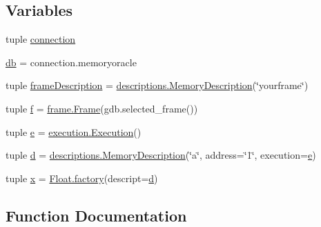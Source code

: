 \subsection*{Variables}
\begin{DoxyCompactItemize}
\item 
tuple \hyperlink{namespacememoryoracle_1_1instance_a5e1db5ce414b598e74fcabb1803e1eb0}{connection}
\item 
\hyperlink{namespacememoryoracle_1_1instance_ad0b99030c18c65a87129ed0c8a7d3b2e}{db} = connection.\+memoryoracle
\item 
tuple \hyperlink{namespacememoryoracle_1_1instance_ab71eabd3bbc314043bb5a1313cc3ab75}{frame\+Description} = \hyperlink{classmemoryoracle_1_1descriptions_1_1MemoryDescription}{descriptions.\+Memory\+Description}(\char`\"{}yourframe\char`\"{})
\item 
tuple \hyperlink{namespacememoryoracle_1_1instance_a29d678ee2f2624880e57ee0ee498e793}{f} = \hyperlink{classmemoryoracle_1_1frame_1_1Frame}{frame.\+Frame}(gdb.\+selected\+\_\+frame())
\item 
tuple \hyperlink{namespacememoryoracle_1_1instance_a8337088b8d0f8b6a58174f7b6a624d9e}{e} = \hyperlink{classmemoryoracle_1_1execution_1_1Execution}{execution.\+Execution}()
\item 
tuple \hyperlink{namespacememoryoracle_1_1instance_a50bbc043ba350bab4859e973b833b71f}{d} = \hyperlink{classmemoryoracle_1_1descriptions_1_1MemoryDescription}{descriptions.\+Memory\+Description}(\char`\"{}a\char`\"{}, address=\char`\"{}1\char`\"{}, execution=\hyperlink{namespacememoryoracle_1_1instance_a8337088b8d0f8b6a58174f7b6a624d9e}{e})
\item 
tuple \hyperlink{namespacememoryoracle_1_1instance_afe036cc8dc71469743d090c4c80d50c5}{x} = \hyperlink{classmemoryoracle_1_1instance_1_1Memory_a050f3787032e0228d9c15baec68ca278}{Float.\+factory}(descript=\hyperlink{namespacememoryoracle_1_1instance_a50bbc043ba350bab4859e973b833b71f}{d})
\end{DoxyCompactItemize}


\subsection{Function Documentation}
\hypertarget{namespacememoryoracle_1_1instance_ac651a8635b1ae2ee7e788bf9adb17a0b}{}
